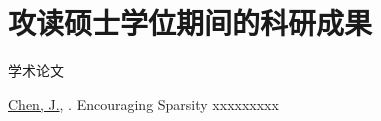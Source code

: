 \chapter{攻读硕士学位期间的科研成果}


\begin{enumerate}[label = {[\arabic*]}]
    \item[] {\heiti 学术论文}
    \item \underline{Chen, J.}, . Encouraging Sparsity xxxxxxxxx
\end{enumerate}
